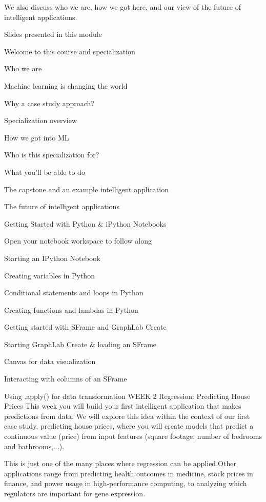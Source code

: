 We also discuss who we are, how we got here, and our view of the future of intelligent applications.
\item Slides presented in this module
\item Welcome to this course and specialization
\item Who we are
\item Machine learning is changing the world
\item Why a case study approach?
\item Specialization overview
\item How we got into ML
\item Who is this specialization for?
\item What you'll be able to do
\item The capstone and an example intelligent application
\item The future of intelligent applications
\item Getting Started with Python & iPython Notebooks
\item Open your notebook workspace to follow along
\item Starting an IPython Notebook
\item Creating variables in Python
\item Conditional statements and loops in Python
\item Creating functions and lambdas in Python
\item Getting started with SFrame and GraphLab Create
\item Starting GraphLab Create & loading an SFrame
\item Canvas for data visualization
\item Interacting with columns of an SFrame
\item Using .apply() for data transformation
WEEK 2
Regression: Predicting House Prices
This week you will build your first intelligent application that makes predictions from data.
We will explore this idea within the context of our first case study, predicting house prices, where you will create models that predict a continuous value (price) from input features (square footage, number of bedrooms and bathrooms,...).

This is just one of the many places where regression can be applied.Other applications range from predicting health outcomes in medicine, stock prices in finance, and power usage in high-performance computing, to analyzing which regulators are important for gene expression.

